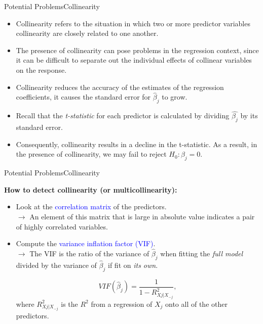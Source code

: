 \begin{frame}{Potential Problems}{Collinearity}

    \begin{itemize}
        \item Collinearity refers to the situation in which two or more predictor variables collinearity are closely related to one another. \pause

        \item The presence of collinearity can pose problems in the regression context, since it can be diﬃcult to separate out the individual eﬀects of collinear variables on the response. \pause

        \item Collinearity reduces the accuracy of the estimates of the regression coeﬃcients, it causes the standard error for $\hat{\beta}_j$ to grow. \pause
        \item Recall that the \textit{t-statistic} for each predictor is calculated by dividing $\hat{\beta_j}$ by its standard error. \pause
        
        \item Consequently, collinearity results in a decline in the t-statistic. As a result, in the presence of collinearity, we may fail to reject $H_0 : \beta_j = 0 $.

    \end{itemize}
    
    
\end{frame}


\begin{frame}{Potential Problems}{Collinearity}

\textbf{How to detect collinearity (or multicollinearity):}

\begin{itemize}
    \item Look at the \textcolor{blue}{correlation matrix} of the predictors. \pause \\ 
    $\rightarrow$ An element of this matrix that is large in absolute value indicates a pair of highly correlated variables. \pause

    \item Compute the \textcolor{blue}{variance inflation factor (VIF)}. \pause \\
    $\rightarrow$ The VIF is the ratio of the variance of $\hat{\beta}_j$ when fitting the \textit{full model} divided by the variance of $\hat{\beta}_j$ if fit on \textit{its own}. \pause

    $$ VIF(\hat{\beta}_j) = \frac{1}{1- R^2_{Xj|X_{-j}}}, $$ \pause
    where $R^2_{Xj|X_{-j}}$ is the $R^2$ from a regression of $X_j$ onto all of the other predictors.

    \end{itemize}
    
\end{frame}

